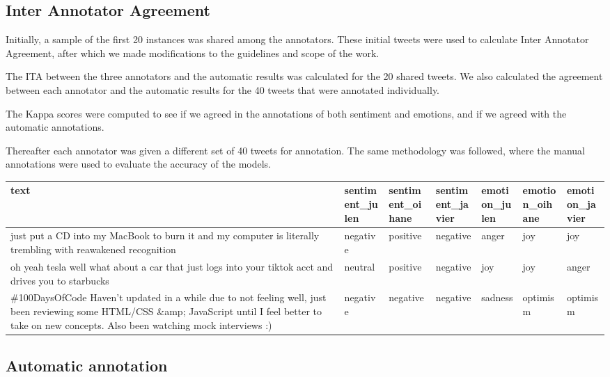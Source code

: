 \documentclass[11pt,a4paper]{article}
\begin{document}
\subsection{Inter Annotator Agreement}

Initially, a sample of the first 20 instances was shared among the annotators. These initial tweets were used to calculate Inter Annotator Agreement, after which we made modifications to the guidelines and scope of the work. 

The ITA between the three annotators and the automatic results was calculated for the 20 shared tweets. We also calculated the agreement between each annotator and the automatic results for the 40 tweets that were annotated individually.

The Kappa scores were computed to see if we agreed in the annotations of both sentiment and emotions, and if we agreed with the automatic annotations.

Thereafter each annotator was given a different set of 40 tweets for annotation. The same methodology was followed, where the manual annotations were used to evaluate the accuracy of the models.

\begin{table*}[]
\centering
\begin{tabular}{|l|l|l|l|l|l|l|}
\hline
text &
  sentiment\_julen &
  sentiment\_oihane &
  sentiment\_javier &
  emotion\_julen &
  emotion\_oihane &
  emotion\_javier \\ \hline
just   put a CD into my MacBook to burn it and my computer is literally trembling   with reawakened recognition &
  negative &
  positive &
  negative &
  anger &
  joy &
  joy \\ \hline
oh   yeah tesla well what about a car that just logs into your tiktok acct and   drives you to starbucks &
  neutral &
  positive &
  negative &
  joy &
  joy &
  anger \\ \hline
\#100DaysOfCode   Haven’t updated in a while due to not feeling well, just been reviewing some   HTML/CSS \&amp; JavaScript until I feel better to take on new concepts. Also   been watching mock interviews  :) &
  negative &
  negative &
  negative &
  sadness &
  optimism &
  optimism \\ \hline
\end{tabular}
\end{table*}

\subsection{Automatic annotation}
\end{document}
